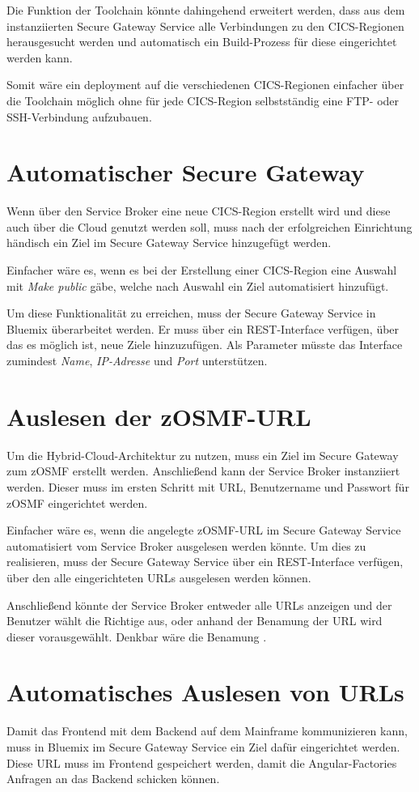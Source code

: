 Die Funktion der Toolchain könnte dahingehend erweitert werden, dass aus dem instanziierten Secure Gateway Service alle
Verbindungen zu den CICS-Regionen herausgesucht werden und automatisch ein Build-Prozess für diese eingerichtet werden kann.

Somit wäre ein deployment auf die verschiedenen CICS-Regionen einfacher über die Toolchain möglich ohne für jede CICS-Region
selbstständig eine FTP- oder SSH-Verbindung aufzubauen.

\section{Automatischer Secure Gateway}
Wenn über den Service Broker eine neue CICS-Region erstellt wird und diese auch über die Cloud genutzt werden soll, muss
nach der erfolgreichen Einrichtung händisch ein Ziel im Secure Gateway Service hinzugefügt werden.

Einfacher wäre es, wenn es bei der Erstellung einer CICS-Region eine Auswahl mit \textit{Make public} gäbe, welche nach
Auswahl ein Ziel automatisiert hinzufügt.

Um diese Funktionalität zu erreichen, muss der Secure Gateway Service in Bluemix überarbeitet werden. Er muss über ein
REST-Interface verfügen, über das es möglich ist, neue Ziele hinzuzufügen. Als Parameter müsste das Interface zumindest
\textit{Name}, \textit{IP-Adresse} und \textit{Port} unterstützen.

\section{Auslesen der zOSMF-URL}
Um die Hybrid-Cloud-Architektur zu nutzen, muss ein Ziel im Secure Gateway zum zOSMF erstellt werden. Anschließend kann
der Service Broker instanziiert werden. Dieser muss im ersten Schritt mit URL, Benutzername und Passwort für zOSMF
eingerichtet werden.

Einfacher wäre es, wenn die angelegte zOSMF-URL im Secure Gateway Service automatisiert vom Service Broker ausgelesen
werden könnte. Um dies zu realisieren, muss der Secure Gateway Service über ein REST-Interface verfügen, über den alle
eingerichteten URLs ausgelesen werden können.

Anschließend könnte der Service Broker entweder alle URLs anzeigen und der Benutzer wählt die Richtige aus, oder anhand
der Benamung der URL wird dieser vorausgewählt. Denkbar wäre die Benamung .

\section{Automatisches Auslesen von URLs}
Damit das Frontend mit dem Backend auf dem Mainframe kommunizieren kann, muss in Bluemix im Secure Gateway Service ein
Ziel dafür eingerichtet werden. Diese URL muss im Frontend gespeichert werden, damit die Angular-Factories Anfragen an
das Backend schicken können.

